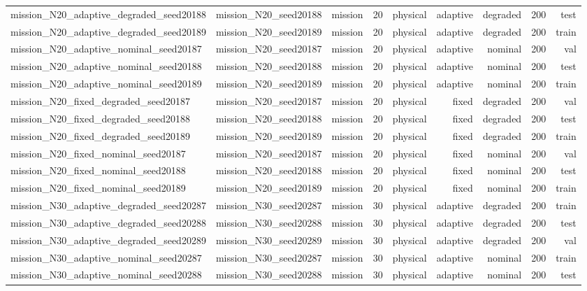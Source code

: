 \begin{tabular}{lrrrrrrrr}
mission\_N20\_adaptive\_degraded\_seed20188 & mission\_N20\_seed20188 & mission & 20 & physical & adaptive & degraded & 200 & test \\
mission\_N20\_adaptive\_degraded\_seed20189 & mission\_N20\_seed20189 & mission & 20 & physical & adaptive & degraded & 200 & train \\
mission\_N20\_adaptive\_nominal\_seed20187 & mission\_N20\_seed20187 & mission & 20 & physical & adaptive & nominal & 200 & val \\
mission\_N20\_adaptive\_nominal\_seed20188 & mission\_N20\_seed20188 & mission & 20 & physical & adaptive & nominal & 200 & test \\
mission\_N20\_adaptive\_nominal\_seed20189 & mission\_N20\_seed20189 & mission & 20 & physical & adaptive & nominal & 200 & train \\
mission\_N20\_fixed\_degraded\_seed20187 & mission\_N20\_seed20187 & mission & 20 & physical & fixed & degraded & 200 & val \\
mission\_N20\_fixed\_degraded\_seed20188 & mission\_N20\_seed20188 & mission & 20 & physical & fixed & degraded & 200 & test \\
mission\_N20\_fixed\_degraded\_seed20189 & mission\_N20\_seed20189 & mission & 20 & physical & fixed & degraded & 200 & train \\
mission\_N20\_fixed\_nominal\_seed20187 & mission\_N20\_seed20187 & mission & 20 & physical & fixed & nominal & 200 & val \\
mission\_N20\_fixed\_nominal\_seed20188 & mission\_N20\_seed20188 & mission & 20 & physical & fixed & nominal & 200 & test \\
mission\_N20\_fixed\_nominal\_seed20189 & mission\_N20\_seed20189 & mission & 20 & physical & fixed & nominal & 200 & train \\
mission\_N30\_adaptive\_degraded\_seed20287 & mission\_N30\_seed20287 & mission & 30 & physical & adaptive & degraded & 200 & train \\
mission\_N30\_adaptive\_degraded\_seed20288 & mission\_N30\_seed20288 & mission & 30 & physical & adaptive & degraded & 200 & test \\
mission\_N30\_adaptive\_degraded\_seed20289 & mission\_N30\_seed20289 & mission & 30 & physical & adaptive & degraded & 200 & val \\
mission\_N30\_adaptive\_nominal\_seed20287 & mission\_N30\_seed20287 & mission & 30 & physical & adaptive & nominal & 200 & train \\
mission\_N30\_adaptive\_nominal\_seed20288 & mission\_N30\_seed20288 & mission & 30 & physical & adaptive & nominal & 200 & test \\

\end{tabular}

